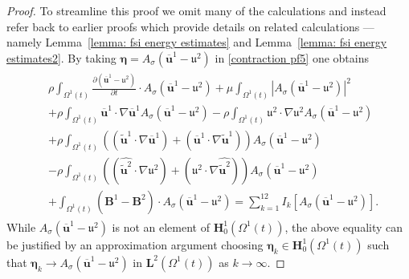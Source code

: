 \documentclass[a4paper]{amsart}
\numberwithin{equation}{section}
\newcommand{\ddt}[1]{\frac{\partial #1}{\partial t}}
\newcommand{\grad}{\nabla}
\theoremstyle{plain}
\newcommand{\mbf}[1]{\mathbf{#1}}
\newcommand{\utwo}{\boldsymbol{\mathfrak{u}}^2}
\begin{document}
\begin{proof}
To streamline this proof we omit many of the calculations and instead refer back to earlier proofs which provide details on related calculations --- namely Lemma~\ref{lemma: fsi energy estimates} and Lemma~\ref{lemma: fsi energy estimates2}.
By taking $\boldsymbol{\eta} = A_{\sigma}(\overline{\mbf{u}}^1 - \utwo)$ in \eqref{contraction pf5} one obtains
\begin{align}
\begin{aligned}
        &\rho \int_{\Omega^1(t)} \ddt{(\overline{\mbf{u}}^1 - \utwo)} \cdot A_{\sigma}(\overline{\mbf{u}}^1 - \utwo) + \mu \int_{\Omega^1(t)} |A_{\sigma}(\overline{\mbf{u}}^1 - \utwo)|^2\\
        &+ \rho \int_{\Omega^1(t)} \overline{\mbf{u}}^1 \cdot \grad\overline{\mbf{u}}^1 A_{\sigma}(\overline{\mbf{u}}^1 - \utwo)
        - \rho \int_{\Omega^1(t)} \utwo \cdot \grad \utwo A_{\sigma}(\overline{\mbf{u}}^1 - \utwo)\\
       &+ \rho \int_{\Omega^1(t)}  \left((\widetilde{\mbf{u}}^1 \cdot \grad \overline{\mbf{u}}^1) + (\overline{\mbf{u}}^1 \cdot \grad\widetilde{\mbf{u}}^1) \right)A_{\sigma}(\overline{\mbf{u}}^1 - \utwo) \\
       &- \rho \int_{\Omega^1(t)}  \left((\widehat{\widetilde{\mbf{u}}^2} \cdot \grad \utwo) + (\utwo \cdot \grad\widehat{\widetilde{\mbf{u}}^2}) \right)A_{\sigma}(\overline{\mbf{u}}^1 - \utwo)\\
       &+ \int_{\Omega^1(t)} (\mbf{B}^1 - \widehat{\mbf{B}^2}) \cdot A_{\sigma}(\overline{\mbf{u}}^1 - \utwo) = \sum_{k=1}^{12} I_k[A_{\sigma}(\overline{\mbf{u}}^1 - \utwo)].
\end{aligned}\label{contraction pf7}
\end{align}
While $A_{\sigma}(\overline{\mbf{u}}^1 - \utwo)$ is not an element of $\mbf{H}_0^1(\Omega^1(t))$, the above equality can be justified by an approximation argument choosing $\boldsymbol{\eta}_k \in \mbf{H}^1_0(\Omega^1(t))$ such that $\boldsymbol{\eta}_k \rightarrow A_{\sigma}(\overline{\mbf{u}}^1 - \utwo)$ in $\mbf{L}^2(\Omega^1(t))$ as $k \rightarrow \infty$.


\end{proof}
\end{document}
